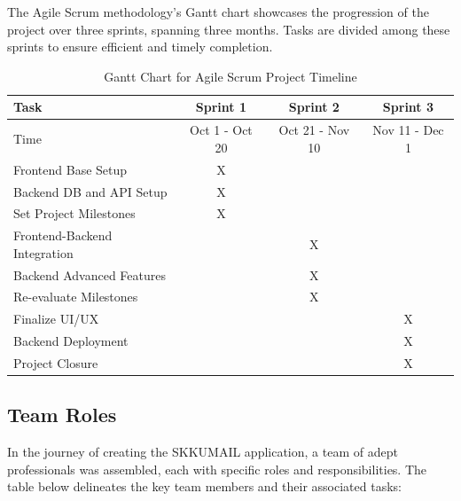 \documentclass[12pt]{article}
\begin{document}
The Agile Scrum methodology's Gantt chart showcases the progression of the project over three sprints, spanning three months. Tasks are divided among these sprints to ensure efficient and timely completion.

\begin{table}[ht]
	\centering
	\begin{tabularx}{\textwidth}{|X|c|c|c|}
		\hline
		\rowcolor{gray!30}
		Task                         & Sprint 1       & Sprint 2        & Sprint 3       \\
		\hline
		\rowcolor{gray!30}
				
		Time                         & Oct 1 - Oct 20 & Oct 21 - Nov 10 & Nov 11 - Dec 1 \\
		\hline
		Frontend Base Setup          & X              &                 &                \\
		\hline
		Backend DB and API Setup     & X              &                 &                \\
		\hline
		Set Project Milestones       & X              &                 &                \\
		\hline
		Frontend-Backend Integration &                & X               &                \\
		\hline
		Backend Advanced Features    &                & X               &                \\
		\hline
		Re-evaluate Milestones       &                & X               &                \\
		\hline
		Finalize UI/UX               &                &                 & X              \\
		\hline
		Backend Deployment           &                &                 & X              \\
		\hline
		Project Closure              &                &                 & X              \\
		\hline
	\end{tabularx}
	\caption{Gantt Chart for Agile Scrum Project Timeline}
\end{table}

\subsection{Team Roles}

In the journey of creating the SKKUMAIL application, a team of adept professionals was assembled, each with specific roles and responsibilities. The table below delineates the key team members and their associated tasks:
\end{document}
